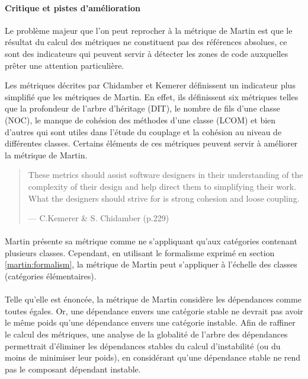 \documentclass{scrartcl}
\begin{document}
    \paragraph{Critique et pistes d'amélioration}
    
    Le problème majeur que l'on peut reprocher à la métrique de Martin est que le résultat du calcul des métriques ne constituent pas des références absolues, ce sont des indicateurs qui peuvent servir à détecter les zones de code auxquelles prêter une attention particulière.
    
    Les métriques décrites par Chidamber et Kemerer\cite{ChidamberKemerer:1994} définissent un  indicateur plus simplifié que les métriques de Martin. En effet, ils définissent six métriques telles que la profondeur de l'arbre d'héritage (DIT), le nombre de fils d'une classe (NOC), le manque de cohésion des méthodes d'une classe (LCOM) et bien d'autres qui sont utiles dans l'étude du couplage et la cohésion au niveau de différentes classes. Certains éléments de ces métriques peuvent servir à améliorer la métrique de Martin.
    
    \begin{quote}
        These metrics should assist software designers in their understanding of the complexity of their design and help direct them to simplifying their work. What the designers should strive for is strong cohesion and loose coupling.
        \begin{flushright}--- C.Kemerer \& S. Chidamber \cite{ChidamberKemerer:1994} (p.229)\end{flushright}
    \end{quote}
    
    \paragraph{}Martin présente sa métrique comme ne s'appliquant qu'aux catégories contenant plusieurs classes. Cependant, en utilisant le formalisme exprimé en section \ref{martin:formalism}, la métrique de Martin peut s'appliquer à l'échelle des classes (catégories élémentaires).
    
    \paragraph{}Telle qu'elle est énoncée, la métrique de Martin considère les dépendances comme toutes égales. Or, une dépendance envers une catégorie stable ne devrait pas avoir le même poids qu'une dépendance envers une catégorie instable. Afin de raffiner le calcul des métriques, une analyse de la globalité de l'arbre des dépendances permettrait d'éliminer les dépendances stables du calcul d'instabilité (ou du moins de minimiser leur poids), en considérant qu'une dépendance stable ne rend pas le composant dépendant instable.
    
\end{document}
